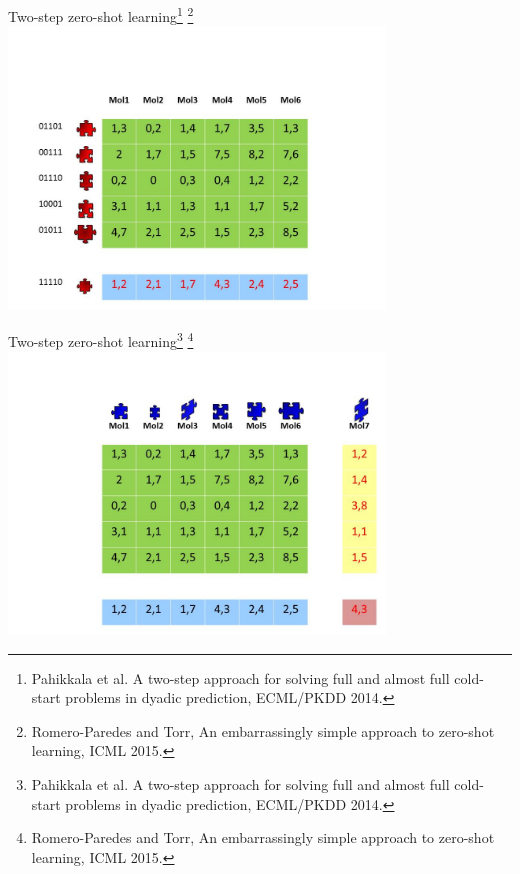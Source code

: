 \documentclass[]{beamer}
\begin{document}
\begin{frame}{Two-step zero-shot learning\footnote{Pahikkala et al. A two-step approach for solving full and almost full cold-start problems in dyadic prediction, ECML/PKDD 2014.} \footnote{Romero-Paredes and Torr, An embarrassingly simple approach to zero-shot learning, ICML 2015.}}
\vspace{0.5cm}
\includegraphics[width=0.75\textwidth,trim = 0 0 0 90,clip]{Figures/pictures/Slide9}
\end{frame}

\begin{frame}{Two-step zero-shot learning\footnote{Pahikkala et al. A two-step approach for solving full and almost full cold-start problems in dyadic prediction, ECML/PKDD 2014.} \footnote{Romero-Paredes and Torr, An embarrassingly simple approach to zero-shot learning, ICML 2015.}}
\vspace{0.5cm}
\includegraphics[width=0.75\textwidth,trim = 0 0 0 90,clip]{Figures/pictures/Slide10}
\end{frame}
\end{document}
